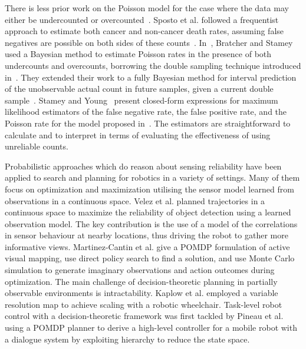 There is less prior work on the Poisson model for the case where the data may either be undercounted or overcounted~\cite{sposto1992,bratcher2002,bratcher2004,stamey2005}. Sposto et al. followed a frequentist approach to estimate both cancer and non-cancer death rates, assuming false negatives are possible on both sides of these counts~\cite{sposto1992}. In~\cite{bratcher2002}, Bratcher and Stamey used a Bayesian method to estimate Poisson rates in the presence of both undercounts and overcounts, borrowing the double sampling technique introduced in~\cite{Tenenbein1970}. They extended their work to a fully Bayesian method for interval prediction of the unobservable actual count in future samples, given a current double sample~\cite{bratcher2004}. Stamey and Young~\cite{stamey2005} present closed-form expressions for maximum likelihood estimators of the false negative rate, the false positive rate, and the Poisson rate for the model proposed in~\cite{bratcher2002}. The estimators are straightforward to calculate and to interpret in terms of evaluating the effectiveness of using unreliable counts.

Probabilistic approaches which do reason about sensing reliability have been applied to search and planning for robotics in a variety of settings. Many of them focus on optimization and maximization utilising the sensor model learned from observations in a continuous space. Velez et al. \cite{velez2012modelling} planned trajectories in a continuous space to maximize the reliability of object detection using a learned observation model. The key contribution is the use of a model of the correlations in sensor behaviour at nearby locations, thus driving the robot to gather more informative views. Martinez-Cantin et al. \cite{martinez2009bayesian} give a POMDP formulation of active visual mapping, use direct policy search to find a solution, and use Monte Carlo simulation to generate imaginary observations and action outcomes during optimization. The main challenge of decision-theoretic planning in partially observable environments is intractability. Kaplow et al. \cite{kaplow2010variable} employed a variable resolution map to achieve scaling with a robotic wheelchair. Task-level robot control with a decision-theoretic framework was first tackled by Pineau et al. \cite{pineau2003towards} using a POMDP planner to derive a high-level controller for a mobile robot with a dialogue system by exploiting hierarchy to reduce the state space.

